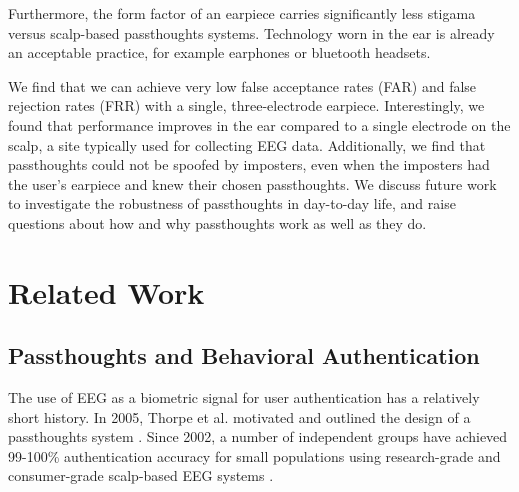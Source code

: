 \documentclass{sigchi}
\begin{document}
Furthermore, the form factor of an earpiece carries significantly less stigama versus scalp-based passthoughts systems. Technology worn in the ear is already an acceptable practice, for example earphones or bluetooth headsets.

We find that we can achieve very low false acceptance rates (FAR) and false rejection rates (FRR) with a single, 
three-electrode earpiece. Interestingly, we found that performance improves in the ear compared to a single electrode on the scalp, a site typically used for collecting EEG data. Additionally, we find that passthoughts could not be spoofed by imposters, even when the imposters had the user's earpiece and knew their chosen passthoughts. We discuss future work to investigate the robustness of passthoughts in day-to-day life, and raise questions about how and why passthoughts work as well as they do.

\section{Related Work}

\subsection{Passthoughts and Behavioral Authentication}
The use of EEG as a biometric signal for user authentication has a relatively short history.
In 2005, Thorpe et al. motivated and outlined the design of a passthoughts system \cite{Thorpe2005}.
Since 2002, a number of independent groups have achieved 99-100\% authentication accuracy for small populations using research-grade and consumer-grade scalp-based EEG systems \cite{Poulos2002,Marcel2007a,Ashby2011,Chuang2013b}.
\end{document}
